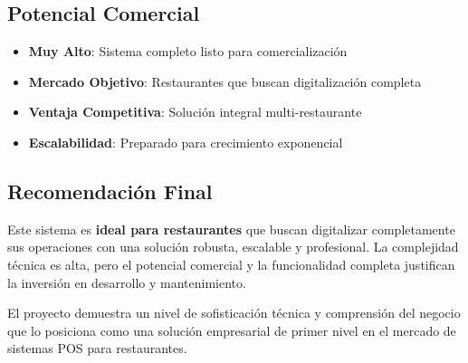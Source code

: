 \documentclass[12pt,a4paper]{article}
\begin{document}
\subsection{Potencial Comercial}

\begin{itemize}
    \item \textbf{Muy Alto}: Sistema completo listo para comercialización
    \item \textbf{Mercado Objetivo}: Restaurantes que buscan digitalización completa
    \item \textbf{Ventaja Competitiva}: Solución integral multi-restaurante
    \item \textbf{Escalabilidad}: Preparado para crecimiento exponencial
\end{itemize}

\subsection{Recomendación Final}

Este sistema es \textbf{ideal para restaurantes} que buscan digitalizar completamente sus operaciones con una solución robusta, escalable y profesional. La complejidad técnica es alta, pero el potencial comercial y la funcionalidad completa justifican la inversión en desarrollo y mantenimiento.

El proyecto demuestra un nivel de sofisticación técnica y comprensión del negocio que lo posiciona como una solución empresarial de primer nivel en el mercado de sistemas POS para restaurantes.
\end{document}
